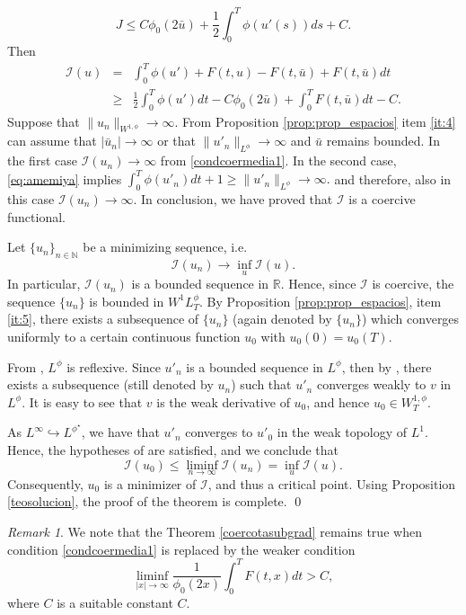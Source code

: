 \documentclass[twoside]{article}
\theoremstyle{definition}
\theoremstyle{plain}
\theoremstyle{remark}
\newtheorem{remark}{Remark}[section]
\newcommand{\lphi}{L^{\phi}}
\newcommand{\wphit}{W^{1}\lphi_T}
\begin{document}
\[J\leq C\phi_0(2\bar{u})+\frac{1}{2}\int_0^T\phi(u'(s))ds+C.\]
Then
\begin{eqnarray*}
\mathcal{I}(u)&=&\int_0^T\phi(u')+F(t,u)-F(t,\bar{u})+F(t,\bar{u})dt\\
&\geq&\frac{1}{2}\int_0^T\phi(u')dt-C \phi_0(2\bar{u})+\int_0^T F(t,\bar{u})dt-C.
\end{eqnarray*}
Suppose that $\|u_n\|_{W^{1,\phi}}\to\infty$. From Proposition \ref{prop:prop_espacios} item \ref{it:4} can assume that $|\bar{u}_n|\to \infty$ or that $\|u'_n\|_{L^\phi}\to \infty$ and $\bar{u}$ remains bounded. In the first case $\mathcal{I}(u_n)\to \infty$ from \ref{condcoermedia1}.  In the second case, \eqref{eq:amemiya}  implies $\int_0^T \phi(u'_n) dt +1\geq \|u'_n\|_{L^\phi} \to \infty.$ and therefore, also in this case $\mathcal{I}(u_n)\to \infty$. In conclusion, we have proved that $\mathcal{I}$ is a coercive functional.

Let $\{u_n\}_{n\in \mathbb{N}}$ be a minimizing sequence, i.e.
\[
\mathcal{I}(u_n) \to \inf_{u} \mathcal{I}(u).
\]
In particular, $\mathcal{I}(u_n)$ is a bounded sequence in $\mathbb{R}$. Hence, since $\mathcal{I}$ is coercive, the sequence $\{u_n\}$ is bounded in $\wphit$. By Proposition \ref{prop:prop_espacios}, item \ref{it:5}, there exists a subsequence of $\{u_n\}$ (again denoted by $\{u_n\}$) which converges uniformly to a certain continuous function $u_0$ with $u_0(0)=u_0(T)$.



From \cite[Th. 7.2]{orliczvectorial2005}, $L^{\phi}$ is reflexive. Since $u'_n$ is a bounded sequence in $L^\phi$, then by \cite[Th. 3.18]{brezis2011functional}, there exists a subsequence (still denoted by $u_n$) such that $u'_n$ converges weakly to $v$ in $L^{\phi}$. It is easy to see that $v$ is the weak derivative of $u_0$, and hence $u_0 \in W^{1,\phi}_T$.

As $L^\infty \hookrightarrow L^{\phi^\star}$, we have that $u'_n$ converges to $u'_0$ in the weak topology of $L^1$. Hence, the hypotheses of \cite[Th. 3.6]{buttazzo1998one} are satisfied, and we conclude that
\[
\mathcal{I}(u_0) \leq \liminf_{n \to \infty} \mathcal{I}(u_n) = \inf_{u} \mathcal{I}(u).
\]
Consequently, $u_0$ is a minimizer of $\mathcal{I}$, and thus a critical point. Using Proposition \ref{teosolucion}, the proof of the theorem is complete. \qed


\begin{remark}
 We note that the Theorem \ref{coercotasubgrad} remains true when condition \ref{condcoermedia1} is replaced by the  weaker condition \[\liminf_{|x|\to\infty}\frac{1}{\phi_0(2x)}\int_0^T F(t,x)dt>C,\]
 where $C$ is a suitable constant $C$.
\end{remark}
\end{document}
